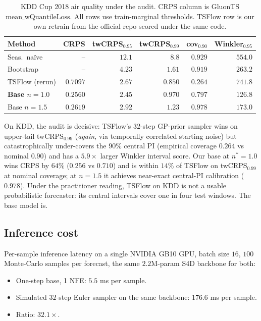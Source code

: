 \documentclass{article}
\begin{document}
\begin{table}[t]
\centering
\caption{KDD Cup 2018 air quality under the audit. CRPS column is
GluonTS $\mathrm{mean\_wQuantileLoss}$. All rows use train-marginal
thresholds. TSFlow row is our own retrain from the official repo
scored under the same code.}
\label{tab:kdd}
\small
\begin{tabular}{lrrrrr}
\toprule
Method & CRPS & twCRPS$_{0.95}$ & twCRPS$_{0.99}$ & cov$_{0.90}$ & Winkler$_{0.95}$ \\
\midrule
Seas.\ naïve         & --      & $12.1$ & $8.8$   & $0.929$          & $554.0$ \\
Bootstrap            & --      & $4.23$ & $1.61$  & $0.919$          & $263.2$ \\
TSFlow (rerun)       & $0.7097$& $2.67$ & $\mathbf{0.850}$ & $0.264$ & $741.8$ \\
\textbf{Base $n{=}1.0$} & $\mathbf{0.2560}$ & $\mathbf{2.45}$ & $0.970$ & $0.797$ & $\mathbf{126.8}$ \\
Base $n{=}1.5$       & $0.2619$& $2.92$ & $1.23$  & $\mathbf{0.978}$ & $173.0$ \\
\bottomrule
\end{tabular}
\end{table}

On KDD, the audit is decisive: TSFlow's $32$-step GP-prior sampler
wins on upper-tail twCRPS$_{0.99}$ (\emph{again}, via temporally
correlated starting noise) but catastrophically under-covers the
$90\%$ central PI (empirical coverage $0.264$ vs nominal $0.90$)
and has a $5.9\times$ larger Winkler interval score. Our base at
$n^*{=}1.0$ wins CRPS by $64\%$ (${0.256}$ vs ${0.710}$) and is
within $14\%$ of TSFlow on twCRPS$_{0.99}$ at nominal coverage; at
$n{=}1.5$ it achieves near-exact central-PI calibration ($0.978$).
Under the practitioner reading, TSFlow on KDD is not a usable
probabilistic forecaster: its central intervals cover one in four
test windows. The base model is.

\subsection{Inference cost}
\label{sec:latency}

Per-sample inference latency on a single NVIDIA GB10 GPU, batch size
$16$, $100$ Monte-Carlo samples per forecast, the same $2.2$M-param
S4D backbone for both:

\begin{itemize}
\item One-step base, 1 NFE: $5.5$ ms per sample.
\item Simulated $32$-step Euler sampler on the same backbone:
$176.6$ ms per sample.
\item Ratio: $32.1\times$.
\end{itemize}
\end{document}
